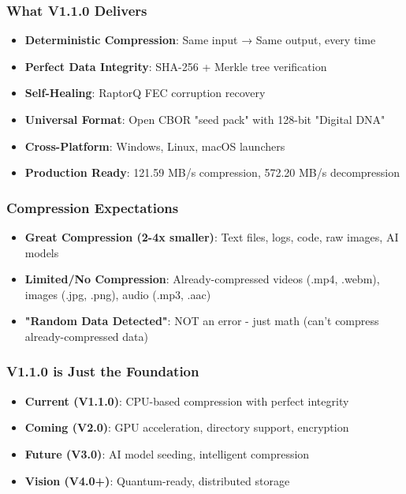 \documentclass[11pt,a4paper]{article}
\begin{document}
	\subsubsection{What V1.1.0 Delivers}
	\begin{itemize}
		\item \textbf{Deterministic Compression}: Same input → Same output, every time
		\item \textbf{Perfect Data Integrity}: SHA-256 + Merkle tree verification
		\item \textbf{Self-Healing}: RaptorQ FEC corruption recovery
		\item \textbf{Universal Format}: Open CBOR "seed pack" with 128-bit "Digital DNA"
		\item \textbf{Cross-Platform}: Windows, Linux, macOS launchers
		\item \textbf{Production Ready}: 121.59 MB/s compression, 572.20 MB/s decompression
	\end{itemize}
	
	\subsubsection{Compression Expectations}
	\begin{itemize}
		\item \textbf{Great Compression (2-4x smaller)}: Text files, logs, code, raw images, AI models
		\item \textbf{Limited/No Compression}: Already-compressed videos (.mp4, .webm), images (.jpg, .png), audio (.mp3, .aac)
		\item \textbf{"Random Data Detected"}: NOT an error - just math (can't compress already-compressed data)
	\end{itemize}
	
	\subsubsection{V1.1.0 is Just the Foundation}
	\begin{itemize}
		\item \textbf{Current (V1.1.0)}: CPU-based compression with perfect integrity
		\item \textbf{Coming (V2.0)}: GPU acceleration, directory support, encryption
		\item \textbf{Future (V3.0)}: AI model seeding, intelligent compression
		\item \textbf{Vision (V4.0+)}: Quantum-ready, distributed storage
	\end{itemize}
	
\end{document}
